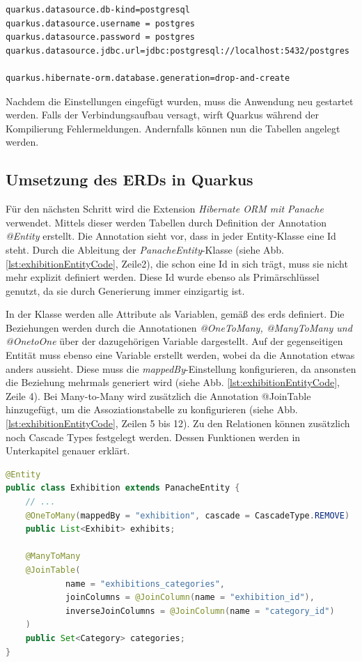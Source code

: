 \begin{lstlisting}[label=lst:quarkusDatasourceProject, caption=Datenbankkonfiguration in \emph{application.properties}]
quarkus.datasource.db-kind=postgresql
quarkus.datasource.username = postgres
quarkus.datasource.password = postgres
quarkus.datasource.jdbc.url=jdbc:postgresql://localhost:5432/postgres

quarkus.hibernate-orm.database.generation=drop-and-create
\end{lstlisting}

Nachdem die Einstellungen eingefügt wurden, muss die Anwendung neu gestartet werden. 
Falls der Verbindungsaufbau versagt, wirft Quarkus während der Kompilierung Fehlermeldungen. 
Andernfalls können nun die Tabellen angelegt werden. 

\subsection{Umsetzung des ERDs in Quarkus}
Für den nächsten Schritt wird die Extension \emph{Hibernate ORM mit Panache} verwendet.
Mittels dieser werden Tabellen durch Definition der Annotation \emph{@Entity} erstellt. 
Die Annotation sieht vor, dass in jeder Entity-Klasse eine Id steht.
Durch die Ableitung der \emph{PanacheEntity}-Klasse (siehe Abb. \ref{lst:exhibitionEntityCode}, Zeile2), die schon eine Id in sich trägt, muss sie nicht mehr explizit definiert werden. 
Diese Id wurde ebenso als Primärschlüssel genutzt, da sie durch Generierung immer einzigartig ist.

In der Klasse werden alle Attribute als Variablen, gemäß des \gls{erd}s definiert. 
Die Beziehungen werden durch die Annotationen \emph{@OneToMany, @ManyToMany und @OnetoOne} über der dazugehörigen Variable dargestellt. 
Auf der gegenseitigen Entität muss ebenso eine Variable erstellt werden, wobei da die Annotation etwas anders aussieht. 
Diese muss die \emph{mappedBy}-Einstellung konfigurieren, da ansonsten die Beziehung mehrmals generiert wird (siehe Abb. \ref{lst:exhibitionEntityCode}, Zeile 4). 
Bei Many-to-Many wird zusätzlich die Annotation @JoinTable hinzugefügt, um die Assoziationstabelle zu konfigurieren (siehe Abb. \ref{lst:exhibitionEntityCode}, Zeilen 5 bis 12). 
Zu den Relationen können zusätzlich noch Cascade Types festgelegt werden. 
Dessen Funktionen werden in Unterkapitel  genauer erklärt. 

\begin{lstlisting}[label=lst:exhibitionEntityCode, language=java, caption=Teil der Exhibition Entität]
@Entity
public class Exhibition extends PanacheEntity {
    // ...
    @OneToMany(mappedBy = "exhibition", cascade = CascadeType.REMOVE)
    public List<Exhibit> exhibits;

    @ManyToMany
    @JoinTable(
            name = "exhibitions_categories",
            joinColumns = @JoinColumn(name = "exhibition_id"),
            inverseJoinColumns = @JoinColumn(name = "category_id")
    )
    public Set<Category> categories;
}
\end{lstlisting}

